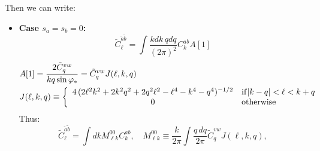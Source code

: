\documentclass[a4paper,10pt]{article}
\begin{document}
    Then we can write:
    \begin{itemize}
      \item {\bf Case $s_a=s_b=0$:}
        \begin{equation}
          \tilde{C}^{\tilde{a}\tilde{b}}_\ell=\int\frac{kdk\,qdq}{(2\pi)^2}C^{ab}_kA\left[1\right]
        \end{equation}
        \begin{align}
          &A[1]=\frac{2\tilde{C}^{vw}_q}{kq\sin\varphi_*}=\tilde{C}^{vw}_qJ(\ell,k,q)\\
          &J(\ell,k,q)\equiv\left\{
          \begin{array}{cl}
            4\,(2\ell^2k^2+2k^2q^2+2q^2\ell^2-\ell^4-k^4-q^4)^{-1/2} & {\rm if} |k-q|<\ell<k+q\\
            0 & {\rm otherwise}
          \end{array}\right.
        \end{align}
        Thus:
        \begin{equation}
          \tilde{C}^{\tilde{a}\tilde{b}}_\ell=\int dkM^{00}_{\ell k}C^{ab}_k,\hspace{12pt}
          M^{00}_{\ell k}\equiv\frac{k}{2\pi}\int\frac{q\,dq}{2\pi}\tilde{C}^{vw}_qJ(\ell,k,q),
        \end{equation}


\end{itemize}
\end{document}
